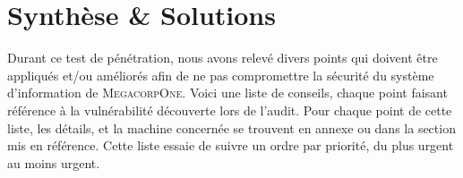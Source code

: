 \documentclass[a4paper]{article}
\begin{document}
\let\cleardoublepage\clearpage

\tableofcontents
\newpage
\section{Synthèse \& Solutions} \label{sec:solutions}
Durant ce test de pénétration, nous avons relevé divers points qui doivent être appliqués et/ou améliorés afin de ne pas compromettre la sécurité du système d'information de \textsc{MegacorpOne}. Voici une liste de conseils, chaque point faisant référence à la vulnérabilité découverte lors de l'audit. Pour chaque point de cette liste, les détails, et la machine concernée se trouvent en annexe ou dans la section mis en référence. Cette liste essaie de suivre un ordre par priorité, du plus urgent au moins urgent.\\
\end{document}
